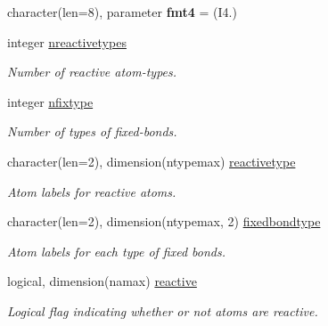 \begin{DoxyCompactItemize}
character(len=8), parameter {\bfseries fmt4} = \textquotesingle{}(I4.)\textquotesingle{}
\item 
\mbox{\label{namespaceglobaldata_a707ac972d8830c0d04df7d622fdfeef5}} 
integer \mbox{\hyperlink{namespaceglobaldata_a707ac972d8830c0d04df7d622fdfeef5}{nreactivetypes}}
\begin{DoxyCompactList}\small\item\em Number of reactive atom-\/types. \end{DoxyCompactList}\item 
\mbox{\label{namespaceglobaldata_a9221bd73313778aba52b20ed3980f661}} 
integer \mbox{\hyperlink{namespaceglobaldata_a9221bd73313778aba52b20ed3980f661}{nfixtype}}
\begin{DoxyCompactList}\small\item\em Number of types of fixed-\/bonds. \end{DoxyCompactList}\item 
\mbox{\label{namespaceglobaldata_aa77f79ce0d70c053453325e1dd335ffc}} 
character(len=2), dimension(ntypemax) \mbox{\hyperlink{namespaceglobaldata_aa77f79ce0d70c053453325e1dd335ffc}{reactivetype}}
\begin{DoxyCompactList}\small\item\em Atom labels for reactive atoms. \end{DoxyCompactList}\item 
\mbox{\label{namespaceglobaldata_ac92f48c1a46722f2d43048b6ccb7616c}} 
character(len=2), dimension(ntypemax, 2) \mbox{\hyperlink{namespaceglobaldata_ac92f48c1a46722f2d43048b6ccb7616c}{fixedbondtype}}
\begin{DoxyCompactList}\small\item\em Atom labels for each type of fixed bonds. \end{DoxyCompactList}\item 
\mbox{\label{namespaceglobaldata_a9de85a9f08091bf134de0ea754c9f194}} 
logical, dimension(namax) \mbox{\hyperlink{namespaceglobaldata_a9de85a9f08091bf134de0ea754c9f194}{reactive}}
\begin{DoxyCompactList}\small\item\em Logical flag indicating whether or not atoms are reactive. \end{DoxyCompactList}\item 

\end{DoxyCompactItemize}
